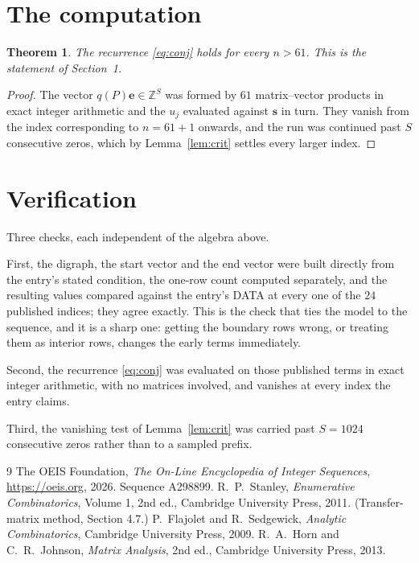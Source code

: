 \documentclass[11pt,a4paper]{article}
\theoremstyle{plain}
\newtheorem{theorem}{Theorem}
\theoremstyle{definition}
\begin{document}
\section{The computation}

\begin{theorem}
The recurrence \eqref{eq:conj} holds for every $n>61$. This is the statement of
Section~1.
\end{theorem}

\begin{proof}
The vector $q(P)\mathbf{e}\in\mathbb{Z}^{S}$ was formed by $61$ matrix--vector
products in exact integer arithmetic and the $u_j$ evaluated against $\mathbf{s}$ in turn.
They vanish from the index corresponding to $n=61+1$ onwards, and the run was continued
past $S$ consecutive zeros, which by Lemma~\ref{lem:crit} settles every larger index.
\end{proof}

\section{Verification}

Three checks, each independent of the algebra above.

First, the digraph, the start vector and the end vector were built directly from the
entry's stated condition, the one-row count computed separately, and the resulting values
compared against the entry's DATA at every one of the $24$ published indices; they
agree exactly. This is the check that ties the model to the sequence, and it is a sharp one:
getting the boundary rows wrong, or treating them as interior rows, changes the early terms
immediately.

Second, the recurrence \eqref{eq:conj} was evaluated on those published terms in exact
integer arithmetic, with no matrices involved, and vanishes at every index the entry claims.

Third, the vanishing test of Lemma~\ref{lem:crit} was carried past $S=1024$ consecutive
zeros rather than to a sampled prefix.

\begin{thebibliography}{9}
 The OEIS Foundation, \emph{The On-Line Encyclopedia of Integer
Sequences}, \url{https://oeis.org}, 2026. Sequence A298899.
 R.~P.~Stanley, \emph{Enumerative Combinatorics}, Volume 1, 2nd ed.,
Cambridge University Press, 2011. (Transfer-matrix method, Section 4.7.)
 P.~Flajolet and R.~Sedgewick, \emph{Analytic Combinatorics}, Cambridge
University Press, 2009.
 R.~A.~Horn and C.~R.~Johnson, \emph{Matrix Analysis}, 2nd ed., Cambridge
University Press, 2013.
\end{thebibliography}
\end{document}
